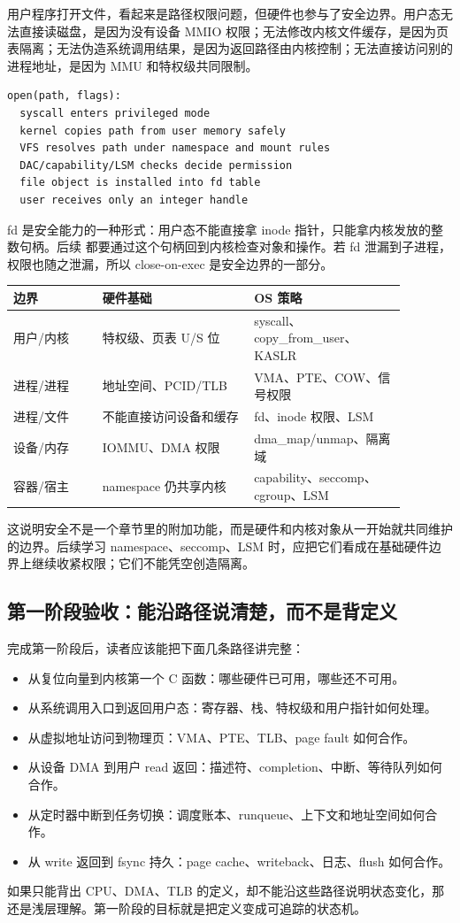 用户程序打开文件，看起来是路径权限问题，但硬件也参与了安全边界。用户态无法直接读磁盘，是因为没有设备 MMIO 权限；无法修改内核文件缓存，是因为页表隔离；无法伪造系统调用结果，是因为返回路径由内核控制；无法直接访问别的进程地址，是因为 MMU 和特权级共同限制。

\begin{lstlisting}
open(path, flags):
  syscall enters privileged mode
  kernel copies path from user memory safely
  VFS resolves path under namespace and mount rules
  DAC/capability/LSM checks decide permission
  file object is installed into fd table
  user receives only an integer handle
\end{lstlisting}

fd 是安全能力的一种形式：用户态不能直接拿 inode 指针，只能拿内核发放的整数句柄。后续  都要通过这个句柄回到内核检查对象和操作。若 fd 泄漏到子进程，权限也随之泄漏，所以 close-on-exec 是安全边界的一部分。

\begin{longtable}{p{0.2\linewidth}p{0.34\linewidth}p{0.34\linewidth}}
\toprule
边界 & 硬件基础 & OS 策略 \\
\midrule
用户/内核 & 特权级、页表 U/S 位 & syscall、copy\_from\_user、KASLR \\
进程/进程 & 地址空间、PCID/TLB & VMA、PTE、COW、信号权限 \\
进程/文件 & 不能直接访问设备和缓存 & fd、inode 权限、LSM \\
设备/内存 & IOMMU、DMA 权限 & dma\_map/unmap、隔离域 \\
容器/宿主 & namespace 仍共享内核 & capability、seccomp、cgroup、LSM \\
\bottomrule
\end{longtable}

这说明安全不是一个章节里的附加功能，而是硬件和内核对象从一开始就共同维护的边界。后续学习 namespace、seccomp、LSM 时，应把它们看成在基础硬件边界上继续收紧权限；它们不能凭空创造隔离。

\subsection{第一阶段验收：能沿路径说清楚，而不是背定义}

完成第一阶段后，读者应该能把下面几条路径讲完整：

\begin{itemize}
\tightlist
\item 从复位向量到内核第一个 C 函数：哪些硬件已可用，哪些还不可用。
\item 从系统调用入口到返回用户态：寄存器、栈、特权级和用户指针如何处理。
\item 从虚拟地址访问到物理页：VMA、PTE、TLB、page fault 如何合作。
\item 从设备 DMA 到用户 read 返回：描述符、completion、中断、等待队列如何合作。
\item 从定时器中断到任务切换：调度账本、runqueue、上下文和地址空间如何合作。
\item 从 write 返回到 fsync 持久：page cache、writeback、日志、flush 如何合作。
\end{itemize}

如果只能背出 CPU、DMA、TLB 的定义，却不能沿这些路径说明状态变化，那还是浅层理解。第一阶段的目标就是把定义变成可追踪的状态机。
